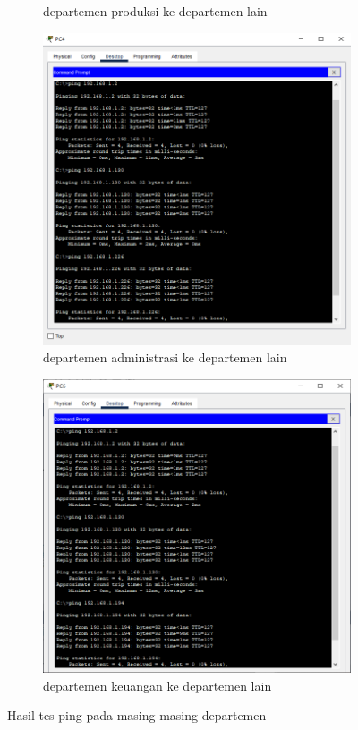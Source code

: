 \begin{figure}[H]
\begin{subfigure}[b]{0.3\linewidth}
      \caption{departemen produksi ke departemen lain}
    \end{subfigure}
    \hspace{1cm}
    \begin{subfigure}[b]{0.3\linewidth}
      \centering
      \includegraphics[width=\linewidth]{image/uji ping2.png}
      \caption{departemen administrasi ke departemen lain}
    \end{subfigure}
    \hspace{1cm}
    \begin{subfigure}[b]{0.3\linewidth}
      \centering
      \includegraphics[width=\linewidth]{image/uji ping3.png}
      \caption{departemen keuangan ke departemen lain}
    \end{subfigure}
    \caption{Hasil tes ping pada masing-masing departemen}
\end{figure}

